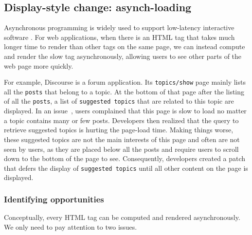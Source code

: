 




\subsection{Display-style change: asynch-loading}
\label{sec:async}

Asynchronous programming is widely used to support
low-latency interactive software \cite{okur2014study, okur2015study, lin2014retrofitting}. For web applications,
when there is an HTML tag that takes much longer time to render than other 
tags on the same page, we can instead compute and render the slow tag asynchronously, allowing users to see other parts of the web page more quickly.

For example, Discourse is a forum application. Its {\tt topics/show} page mainly
lists all the {\tt posts} that belong to a topic. At the bottom of that page after the listing of
all the {\tt posts}, a list of
{\tt suggested topics} that are related to this topic are displayed. 
In an issue~\cite{discourse4663}, users complained that this page is
slow to load no matter a topic contains many or few posts. 
Developers then realized that the query to retrieve suggested topics
is hurting the page-load time. Making things worse, these suggested topics
are not the main interests of this page and often are not seen by users, as they 
are placed below all the posts and require users to scroll down to the bottom of 
the page to see. %
Consequently, developers created a patch that defers the display of
{\tt suggested topics} until all other content on the page is
 displayed. 


\subsubsection{Identifying opportunities}
\label{sec:async_op}
Conceptually, every HTML tag can be computed and rendered asynchronously. 
We only need to pay attention to two issues. 

